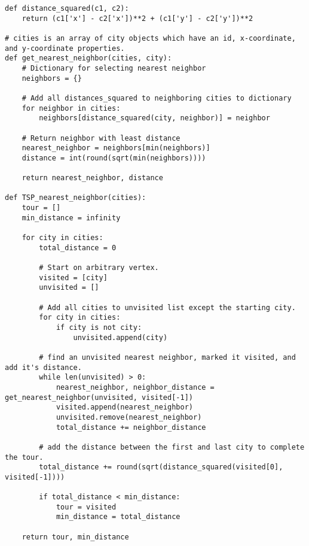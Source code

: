 \documentclass[Group45_Project_Report.tex]{subfiles}
\begin{document}
\begin{verbatim}
def distance_squared(c1, c2):
	return (c1['x'] - c2['x'])**2 + (c1['y'] - c2['y'])**2

# cities is an array of city objects which have an id, x-coordinate, and y-coordinate properties.
def get_nearest_neighbor(cities, city):
	# Dictionary for selecting nearest neighbor
	neighbors = {}

	# Add all distances_squared to neighboring cities to dictionary
	for neighbor in cities:
		neighbors[distance_squared(city, neighbor)] = neighbor

	# Return neighbor with least distance
	nearest_neighbor = neighbors[min(neighbors)]
	distance = int(round(sqrt(min(neighbors))))

	return nearest_neighbor, distance

def TSP_nearest_neighbor(cities):
	tour = []
	min_distance = infinity
	
	for city in cities:
		total_distance = 0

		# Start on arbitrary vertex.
		visited = [city]
		unvisited = []

		# Add all cities to unvisited list except the starting city.
		for city in cities:
			if city is not city:
				unvisited.append(city)

		# find an unvisited nearest neighbor, marked it visited, and add it's distance.
		while len(unvisited) > 0:
			nearest_neighbor, neighbor_distance = get_nearest_neighbor(unvisited, visited[-1])
			visited.append(nearest_neighbor)
			unvisited.remove(nearest_neighbor)
			total_distance += neighbor_distance	

		# add the distance between the first and last city to complete the tour.
		total_distance += round(sqrt(distance_squared(visited[0], visited[-1])))

		if total_distance < min_distance:
			tour = visited
			min_distance = total_distance

	return tour, min_distance
\end{verbatim}
\end{document}
